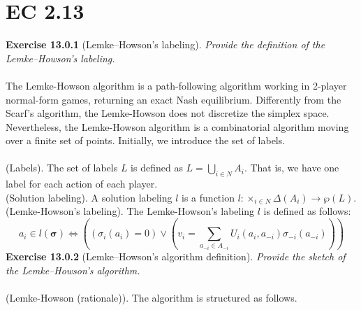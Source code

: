 \section{EC 2.13}

\textbf{Exercise 13.0.1} (Lemke–Howson’s labeling). \textit{Provide the definition of the Lemke–Howson’s labeling.}\\\\
The Lemke-Howson algorithm is a path-following algorithm working in 2-player normal-form games, returning an exact Nash equilibrium. Differently from the Scarf’s algorithm, the Lemke-Howson does not discretize the simplex space. Nevertheless, the Lemke-Howson algorithm is a combinatorial algorithm moving over a finite set
of points. Initially, we introduce the set of labels.\\\\
(Labels). The set of labels $L$ is defined as $L = \bigcup_{i \in N}{A_i}$. That is, we have one label for each action of each player.\\
(Solution labeling). A solution labeling $l$ is a function $l: \times_{i \in N} \Delta (A_i) \rightarrow \wp (L)$.
(Lemke-Howson's labeling). The Lemke-Howson's labeling $l$ is defined as follows:
$$
a_{i} \in l(\bm{\sigma}) \Longleftrightarrow\left(\left(\sigma_{i}\left(a_{i}\right)=0\right) \vee\left(v_{i}=\sum_{a_{-i} \in A_{-i}} U_{i}\left(a_{i}, a_{-i}\right) \sigma_{-i}\left(a_{-i}\right)\right)\right)
$$
\textbf{Exercise 13.0.2} (Lemke–Howson’s algorithm definition). \textit{Provide the sketch of the Lemke–Howson’s algorithm.}\\\\
(Lemke-Howson (rationale)). The algorithm is structured as follows.
